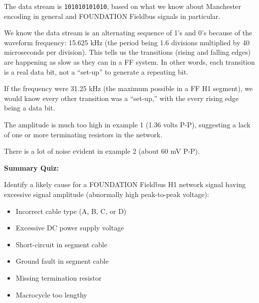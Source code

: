 The data stream is {\tt 101010101010}, based on what we know about Manchester encoding in general and FOUNDATION Fieldbus signals in particular.  







We know the data stream is an alternating sequence of 1's and 0's because of the waveform frequency: 15.625 kHz (the period being 1.6 divisions multiplied by 40 microseconds per division).  This tells us the transitions (rising and falling edges) are happening as slow as they can in a FF system.  In other words, each transition is a real data bit, not a ``set-up'' to generate a repeating bit.  

If the frequency were 31.25 kHz (the maximum possible in a FF H1 segment), we would know every other transition was a ``set-up,'' with the every rising edge being a data bit.

\vskip 10pt

The amplitude is much too high in example 1 (1.36 volts P-P), suggesting a lack of one or more terminating resistors in the network.

\vskip 10pt

There is a lot of noise evident in example 2 (about 60 mV P-P).

\vfil \eject

\noindent
{\bf Summary Quiz:}

Identify a likely cause for a FOUNDATION Fieldbus H1 network signal having excessive signal amplitude (abnormally high peak-to-peak voltage):

\begin{itemize}
\item{} Incorrect cable type (A, B, C, or D)
\vskip 5pt 
\item{} Excessive DC power supply voltage
\vskip 5pt 
\item{} Short-circuit in segment cable
\vskip 5pt 
\item{} Ground fault in segment cable
\vskip 5pt 
\item{} Missing termination resistor
\vskip 5pt 
\item{} Macrocycle too lengthy
\end{itemize}





